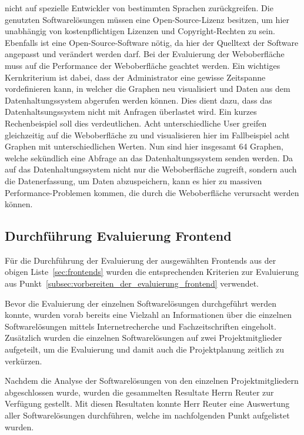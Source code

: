 \begin{outline}
  nicht auf spezielle Entwickler von bestimmten Sprachen zurückgreifen.
  \1 Die genutzten Softwarelösungen müssen eine Open-Source-Lizenz besitzen, um
  hier unabhängig von kostenpflichtigen Lizenzen und Copyright-Rechten zu sein.
  Ebenfalls ist eine Open-Source-Software nötig, da hier der Quelltext der
  Software angepasst und verändert werden darf.
  \1 Bei der Evaluierung der Weboberfläche muss auf die Performance der
  Weboberfläche geachtet werden. Ein wichtiges Kernkriterium ist dabei, dass
  der Administrator eine gewisse Zeitspanne vordefinieren kann, in welcher die
  Graphen neu visualisiert und Daten aus dem Datenhaltungssystem abgerufen
  werden können. Dies dient dazu, dass das Datenhaltsungssystem nicht mit
  Anfragen überlastet wird. Ein kurzes Rechenbeispiel soll dies verdeutlichen.
  Acht unterschiedliche User greifen gleichzeitig auf die Weboberfläche zu und
  visualisieren hier im Fallbeispiel acht Graphen mit unterschiedlichen
  Werten. Nun sind hier insgesamt 64 Graphen, welche sekündlich eine Abfrage an
  das Datenhaltungssystem senden werden. Da auf das Datenhaltungssystem nicht
  nur die Weboberfläche zugreift, sondern auch die Datenerfassung, um Daten
  abzuspeichern, kann es hier zu massiven Performance-Problemen kommen, die
  durch die Weboberfläche verursacht werden können.
\end{outline}
\mr%

\subsection{Durchführung Evaluierung Frontend}
\label{subsec:durchfuehrung_evaluierung_frontend}
Für die Durchführung der Evaluierung der ausgewählten Frontends aus der obigen
Liste~\ref{sec:frontends} wurden die entsprechenden Kriterien zur
Evaluierung aus Punkt~\ref{subsec:vorbereiten_der_evaluierung_frontend}
verwendet.


Bevor die Evaluierung der einzelnen Softwarelösungen durchgeführt werden
konnte, wurden vorab bereits eine Vielzahl an Informationen über die einzelnen
Softwarelösungen mittels Internetrecherche und Fachzeitschriften eingeholt.
Zusätzlich wurden die einzelnen Softwarelösungen auf zwei Projektmitglieder
aufgeteilt, um die Evaluierung und damit auch die Projektplanung zeitlich zu
verkürzen.

Nachdem die Analyse der Softwarelösungen von den einzelnen Projektmitgliedern
abgeschlossen wurde, wurden die gesammelten Resultate Herrn Reuter zur
Verfügung gestellt. Mit diesen Resultaten konnte Herr Reuter eine Auswertung
aller Softwarelösungen durchführen, welche im nachfolgenden Punkt aufgelistet
wurden.

